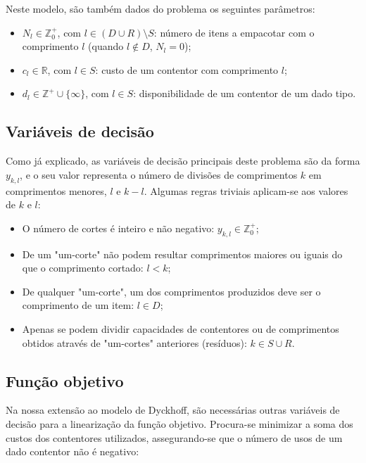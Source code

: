 \documentclass[12pt, a4paper, titlepage]{article}
\begin{document}
Neste modelo, são também dados do problema os seguintes parâmetros:

\begin{itemize}
    \item $N_l \in \mathbb{Z}^+_0$, com $l \in (D \cup R) \setminus S$: número de itens a empacotar
        com o comprimento $l$ (quando $l \not \in D$, $N_l = 0$);
    \item $c_l \in \mathbb{R}$, com $l \in S$: custo de um contentor com comprimento $l$;
    \item $d_l \in \mathbb{Z}^+ \cup \{ \infty \}$, com $l \in S$: disponibilidade de um contentor
        de um dado tipo.
\end{itemize}

\subsection{Variáveis de decisão}

Como já explicado, as variáveis de decisão principais deste problema são da forma $y_{k, l}$, e o
seu valor representa o número de divisões de comprimentos $k$ em comprimentos menores, $l$ e
$k - l$. Algumas regras triviais aplicam-se aos valores de $k$ e $l$:

\begin{itemize}
    \item O número de cortes é inteiro e não negativo: $y_{k, l} \in \mathbb{Z}^+_0$;
    \item De um "um-corte"{} não podem resultar comprimentos maiores ou iguais do que o comprimento
        cortado: $l < k$;
    \item De qualquer "um-corte"{}, um dos comprimentos produzidos deve ser o comprimento de um
        item: $l \in D$;
    \item Apenas se podem dividir capacidades de contentores ou de comprimentos obtidos através de
        "um-cortes"{} anteriores (resíduos): $k \in S \cup R$.
\end{itemize}

\subsection{Função objetivo}

Na nossa extensão ao modelo de Dyckhoff, são necessárias outras variáveis de decisão para a
linearização da função objetivo. Procura-se minimizar a soma dos custos dos contentores utilizados,
assegurando-se que o número de usos de um dado contentor não é negativo:
\end{document}
